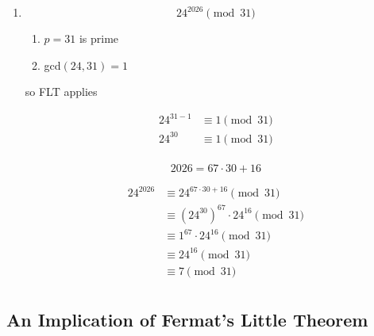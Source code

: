 \documentclass[../../Main.tex]{subfiles}
\begin{document}
\begin{example}
\begin{enumerate}
{            Now let's break up 46 into powers of 2

            \begin{align*}
                13^{2026} &\equiv 13^{46} \\
                &\equiv 13^{32} \cdot 13^8 \cdot 13^4 \cdot 13^2 \pmod{253} \\
                &\equiv 246 \cdot 25 \cdot 225 \cdot 169 \pmod{253} \\
                \Aboxed{&\equiv 31}
            \end{align*}
        } %

        \item 
        {
            $$24^{2026} \pmod{31}$$

            \begin{enumerate}
                \item $p = 31$ is prime
                \item gcd$(24, 31) = 1$
            \end{enumerate}

            so FLT applies

            \begin{align*}
                24^{31 - 1} &\equiv 1 \pmod{31} \\
                24^{30} &\equiv 1 \pmod{31} \\
            \end{align*}

            $$2026 = 67 \cdot 30 + 16$$

            \begin{align*}
                24^{2026} &\equiv 24^{67 \cdot 30 + 16} \pmod{31} \\
                &\equiv \left( 24^{30} \right)^{67} \cdot 24^{16} \pmod{31} \\
                &\equiv 1^{67} \cdot 24^{16} \pmod{31} \\
                &\equiv 24^{16} \pmod{31} \\
                &\equiv 7 \pmod{31} \tag{brute forced}\\
             \end{align*}
        } %
    \end{enumerate}
\end{example}

\subsection{An Implication of Fermat's Little Theorem}
\end{document}
